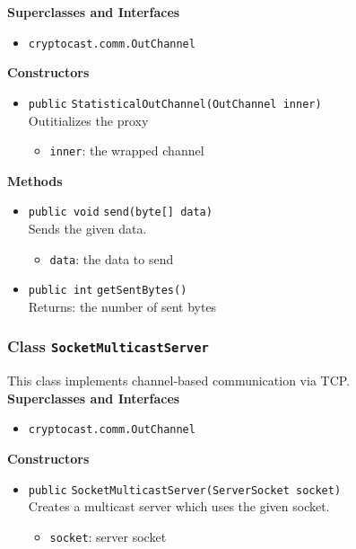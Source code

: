 \textbf{Superclasses and Interfaces}
\begin{itemize}
\item \lstinline|cryptocast.comm.OutChannel|
\end{itemize}



\textbf{Constructors}
\begin{itemize}
\item \lstinline|public| \lstinline|StatisticalOutChannel|\lstinline|(OutChannel inner)|\\
Outitializes the proxy
\begin{itemize}
\item \lstinline|inner|: the wrapped channel
\end{itemize}



\end{itemize}


\textbf{Methods}
\begin{itemize}
\item \lstinline|public void| \lstinline|send|\lstinline|(byte[] data)|\\
Sends the given data.
\begin{itemize}
\item \lstinline|data|: the data to send
\end{itemize}



\item \lstinline|public int| \lstinline|getSentBytes|\lstinline|()|\\
Returns: the number of sent bytes



\end{itemize}

\subsubsection{Class \lstinline|SocketMulticastServer|}
This class implements channel-based communication via TCP. \\


\textbf{Superclasses and Interfaces}
\begin{itemize}
\item \lstinline|cryptocast.comm.OutChannel|
\end{itemize}



\textbf{Constructors}
\begin{itemize}
\item \lstinline|public| \lstinline|SocketMulticastServer|\lstinline|(ServerSocket socket)|\\
Creates a multicast server which uses the given socket.
\begin{itemize}
\item \lstinline|socket|: server socket
\end{itemize}



\end{itemize}


